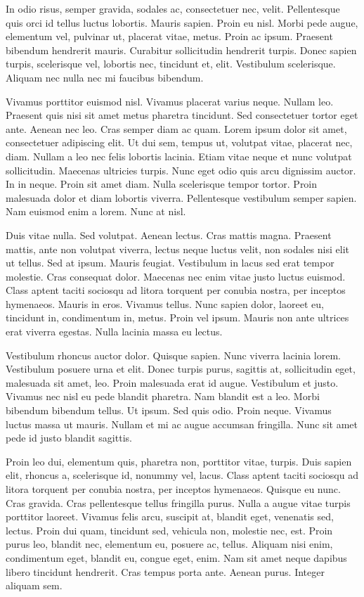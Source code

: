 \documentclass[eng,printmode]{mgr}
\begin{document}
In odio risus, semper gravida, sodales ac, consectetuer nec, velit. Pellentesque quis orci id tellus luctus lobortis. Mauris sapien. Proin eu nisl. Morbi pede augue, elementum vel, pulvinar ut, placerat vitae, metus. Proin ac ipsum. Praesent bibendum hendrerit mauris. Curabitur sollicitudin hendrerit turpis. Donec sapien turpis, scelerisque vel, lobortis nec, tincidunt et, elit. Vestibulum scelerisque. Aliquam nec nulla nec mi faucibus bibendum. 

Vivamus porttitor euismod nisl. Vivamus placerat varius neque. Nullam leo. Praesent quis nisi sit amet metus pharetra tincidunt. Sed consectetuer tortor eget ante. Aenean nec leo. Cras semper diam ac quam. Lorem ipsum dolor sit amet, consectetuer adipiscing elit. Ut dui sem, tempus ut, volutpat vitae, placerat nec, diam. Nullam a leo nec felis lobortis lacinia. Etiam vitae neque et nunc volutpat sollicitudin. Maecenas ultricies turpis. Nunc eget odio quis arcu dignissim auctor. In in neque. Proin sit amet diam. Nulla scelerisque tempor tortor. Proin malesuada dolor et diam lobortis viverra. Pellentesque vestibulum semper sapien. Nam euismod enim a lorem. Nunc at nisl. 

Duis vitae nulla. Sed volutpat. Aenean lectus. Cras mattis magna. Praesent mattis, ante non volutpat viverra, lectus neque luctus velit, non sodales nisi elit ut tellus. Sed at ipsum. Mauris feugiat. Vestibulum in lacus sed erat tempor molestie. Cras consequat dolor. Maecenas nec enim vitae justo luctus euismod. Class aptent taciti sociosqu ad litora torquent per conubia nostra, per inceptos hymenaeos. Mauris in eros. Vivamus tellus. Nunc sapien dolor, laoreet eu, tincidunt in, condimentum in, metus. Proin vel ipsum. Mauris non ante ultrices erat viverra egestas. Nulla lacinia massa eu lectus. 

Vestibulum rhoncus auctor dolor. Quisque sapien. Nunc viverra lacinia lorem. Vestibulum posuere urna et elit. Donec turpis purus, sagittis at, sollicitudin eget, malesuada sit amet, leo. Proin malesuada erat id augue. Vestibulum et justo. Vivamus nec nisl eu pede blandit pharetra. Nam blandit est a leo. Morbi bibendum bibendum tellus. Ut ipsum. Sed quis odio. Proin neque. Vivamus luctus massa ut mauris. Nullam et mi ac augue accumsan fringilla. Nunc sit amet pede id justo blandit sagittis. 

Proin leo dui, elementum quis, pharetra non, porttitor vitae, turpis. Duis sapien elit, rhoncus a, scelerisque id, nonummy vel, lacus. Class aptent taciti sociosqu ad litora torquent per conubia nostra, per inceptos hymenaeos. Quisque eu nunc. Cras gravida. Cras pellentesque tellus fringilla purus. Nulla a augue vitae turpis porttitor laoreet. Vivamus felis arcu, suscipit at, blandit eget, venenatis sed, lectus. Proin dui quam, tincidunt sed, vehicula non, molestie nec, est. Proin purus leo, blandit nec, elementum eu, posuere ac, tellus. Aliquam nisi enim, condimentum eget, blandit eu, congue eget, enim. Nam sit amet neque dapibus libero tincidunt hendrerit. Cras tempus porta ante. Aenean purus. Integer aliquam sem. 
\end{document}
